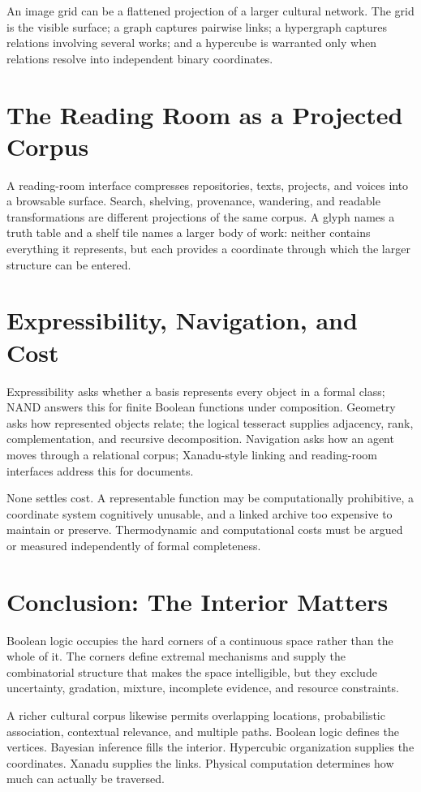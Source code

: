 \documentclass[11pt]{article}
\begin{document}
An image grid can be a flattened projection of a larger cultural network. The grid is the visible surface; a graph captures pairwise links; a hypergraph captures relations involving several works; and a hypercube is warranted only when relations resolve into independent binary coordinates.

\section{The Reading Room as a Projected Corpus}

A reading-room interface compresses repositories, texts, projects, and voices into a browsable surface. Search, shelving, provenance, wandering, and readable transformations are different projections of the same corpus. A glyph names a truth table and a shelf tile names a larger body of work: neither contains everything it represents, but each provides a coordinate through which the larger structure can be entered.

\section{Expressibility, Navigation, and Cost}

Expressibility asks whether a basis represents every object in a formal class; NAND answers this for finite Boolean functions under composition. Geometry asks how represented objects relate; the logical tesseract supplies adjacency, rank, complementation, and recursive decomposition. Navigation asks how an agent moves through a relational corpus; Xanadu-style linking and reading-room interfaces address this for documents.

None settles cost. A representable function may be computationally prohibitive, a coordinate system cognitively unusable, and a linked archive too expensive to maintain or preserve. Thermodynamic and computational costs must be argued or measured independently of formal completeness.

\section{Conclusion: The Interior Matters}

Boolean logic occupies the hard corners of a continuous space rather than the whole of it. The corners define extremal mechanisms and supply the combinatorial structure that makes the space intelligible, but they exclude uncertainty, gradation, mixture, incomplete evidence, and resource constraints.

A richer cultural corpus likewise permits overlapping locations, probabilistic association, contextual relevance, and multiple paths. Boolean logic defines the vertices. Bayesian inference fills the interior. Hypercubic organization supplies the coordinates. Xanadu supplies the links. Physical computation determines how much can actually be traversed.
\end{document}
